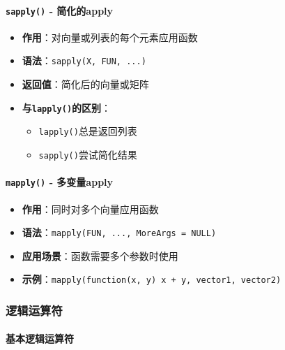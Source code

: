 \documentclass[
  twoside]{book}
\providecommand{\tightlist}{%
  \setlength{\itemsep}{0pt}\setlength{\parskip}{0pt}}
\begin{document}
\hypertarget{sapply---ux7b80ux5316ux7684apply}{%
\paragraph{\texorpdfstring{\texttt{sapply()} - 简化的apply}{sapply() - 简化的apply}}\label{sapply---ux7b80ux5316ux7684apply}}

\begin{itemize}
\tightlist
\item
  \textbf{作用}：对向量或列表的每个元素应用函数
\item
  \textbf{语法}：\texttt{sapply(X,\ FUN,\ ...)}
\item
  \textbf{返回值}：简化后的向量或矩阵
\item
  \textbf{与\texttt{lapply()}的区别}：

  \begin{itemize}
  \tightlist
  \item
    \texttt{lapply()}总是返回列表
  \item
    \texttt{sapply()}尝试简化结果
  \end{itemize}
\end{itemize}

\hypertarget{mapply---ux591aux53d8ux91cfapply}{%
\paragraph{\texorpdfstring{\texttt{mapply()} - 多变量apply}{mapply() - 多变量apply}}\label{mapply---ux591aux53d8ux91cfapply}}

\begin{itemize}
\tightlist
\item
  \textbf{作用}：同时对多个向量应用函数
\item
  \textbf{语法}：\texttt{mapply(FUN,\ ...,\ MoreArgs\ =\ NULL)}
\item
  \textbf{应用场景}：函数需要多个参数时使用
\item
  \textbf{示例}：\texttt{mapply(function(x,\ y)\ x\ +\ y,\ vector1,\ vector2)}
\end{itemize}

\hypertarget{ux903bux8f91ux8fd0ux7b97ux7b26}{%
\subsubsection{逻辑运算符}\label{ux903bux8f91ux8fd0ux7b97ux7b26}}

\hypertarget{ux57faux672cux903bux8f91ux8fd0ux7b97ux7b26}{%
\paragraph{基本逻辑运算符}\label{ux57faux672cux903bux8f91ux8fd0ux7b97ux7b26}}
\end{document}
